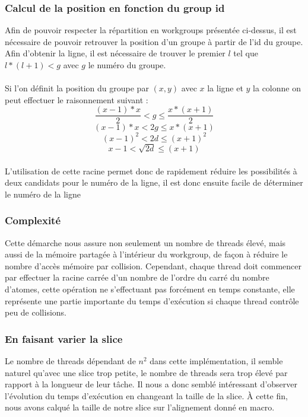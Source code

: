 \documentclass{article}
\begin{document}
\subsubsection{Calcul de la position en fonction du group id}
Afin de pouvoir respecter la répartition en workgroups présentée ci-dessus, il
est nécessaire de pouvoir retrouver la position d'un groupe à partir de l'id du
groupe. Afin d'obtenir la ligne, il est nécessaire de trouver le premier $l$ tel
que $l* (l+1) < g$ avec $g$ le numéro du groupe.
\paragraph{}
Si l'on définit la position du groupe par $(x,y)$ avec $x$ la ligne et $y$ la
colonne on peut effectuer le raisonnement suivant :
$$\frac{(x-1) * x}{2} < g \leq \frac{x * (x+1)}{2}$$
$$(x-1) * x < 2g \leq x * (x+1)$$
$$(x-1)^2 < 2d \leq (x+1)^2$$
$$x-1 < \sqrt{2d} \leq (x+1)$$
\paragraph{}
L'utilisation de cette racine permet donc de rapidement réduire les possibilités
à deux candidats pour le numéro de la ligne, il est donc ensuite facile de
déterminer le numéro de la ligne

\subsubsection{Complexité}
Cette démarche nous assure non seulement un nombre de threads élevé, mais aussi
de la mémoire partagée à l'intérieur du workgroup, de façon à réduire le nombre
d'accès mémoire par collision. Cependant, chaque thread doit commencer par
effectuer la racine carrée d'un nombre de l'ordre du carré du nombre d'atomes,
cette opération ne s'effectuant pas forcément en temps constante, elle
représente une partie importante du temps d'exécution si chaque thread contrôle
peu de collisions.
\subsubsection{En faisant varier la slice}
Le nombre de threads dépendant de $n^2$ dans cette implémentation, il semble
naturel qu'avec une slice trop petite, le nombre de threads sera trop élevé par
rapport à la longueur de leur tâche. Il nous a donc semblé intéressant
d'observer l'évolution du temps d'exécution en changeant la taille de la slice.
À cette fin, nous avons calqué la taille de notre slice sur l'alignement donné
en macro.
\end{document}
